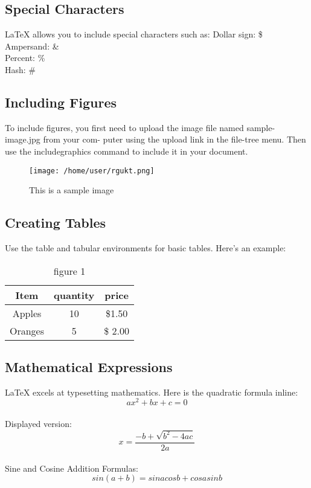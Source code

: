 \documentclass{article}
\begin{document}
\subsection{Special Characters}
LaTeX allows you to include special characters such as:
Dollar sign: \$\\
Ampersand: \&\\
Percent: \%\\
Hash: \#\\
\subsection{Including Figures}
To include figures, you first need to upload the image file named sample-image.jpg
from your com-
puter using the upload link in the file-tree menu. Then use the includegraphics
command to include
it in your document.
 \begin{figure}
	\texttt{[image: /home/user/rgukt.png]}
	
	\caption{This is a sample image}
	\label{fig:example}
\end{figure}
\subsection{Creating Tables}
Use the table and tabular environments for basic tables. Here’s an example:

\begin{table}
	\begin{tabular}{|c|c|c|}
		Item  & quantity & price\\
		 \hline
	 Apples & 10 & \$1.50 \\

	Oranges & 5 & \$ 2.00
	
	
	\end{tabular}
	\caption{figure 1}
\label{fig:example}
\end{table}
\subsection{Mathematical Expressions}
LaTeX excels at typesetting mathematics. Here is the quadratic formula inline:
$$ ax^2 + bx +c = 0 $$\\
 
  Displayed version: $$ x = \frac{-b+\sqrt{b^2-4ac}}{2a}$$\\
  Sine and Cosine Addition Formulas:\\
 \centering $$ sin(a + b) = sinacosb + cosasinb$$\\
 
\end{document}
